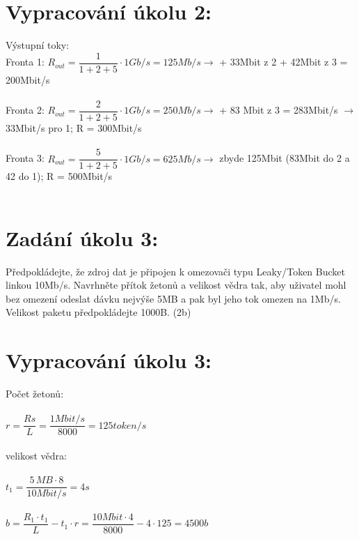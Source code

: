\documentclass[10pt, a4paper]{article}%
\begin{document}
\section*{Vypracování úkolu 2:}
\noindent Výstupní toky:\\
Fronta 1: $R_{out} = \dfrac{1}{1+2+5}\cdot 1Gb/s = 125Mb/s\rightarrow$ + 33Mbit z 2 + 42Mbit z 3 = 200Mbit/s \\\\
Fronta 2: $R_{out} = \dfrac{2}{1+2+5}\cdot 1Gb/s = 250Mb/s\rightarrow$ + 83 Mbit z 3 = 283Mbit/s $\rightarrow$  33Mbit/s pro 1; R = 300Mbit/s\\\\
Fronta 3: $R_{out} = \dfrac{5}{1+2+5}\cdot 1Gb/s = 625Mb/s\rightarrow$ zbyde 125Mbit (83Mbit do 2 a 42 do 1); R = 500Mbit/s\\\\
\clearpage

\section*{Zadání úkolu 3:}
Předpokládejte, že zdroj dat je připojen k omezovači typu Leaky/Token Bucket linkou 10Mb/s. 
Navrhněte přítok žetonů a velikost vědra tak, aby uživatel mohl bez omezení odeslat dávku 
nejvýše 5MB a pak byl jeho tok omezen na 1Mb/s. Velikost paketu předpokládejte 1000B. (2b)

\section*{Vypracování úkolu 3:}
\noindent Počet žetonů:\\\\
$r = \dfrac{Rs}{L} = \dfrac{1Mbit/s}{8000} = 125token/s$\\\\
velikost vědra:\\\\
$t_1 = \dfrac{5\,MB\cdot 8}{10Mbit/s} = 4s$\\\\
$b = \dfrac{R_1\cdot t_1}{L} -t_1 \cdot r =  \dfrac{10Mbit\cdot 4}{8000} -4 \cdot 125 = 4500b$
\end{document}
